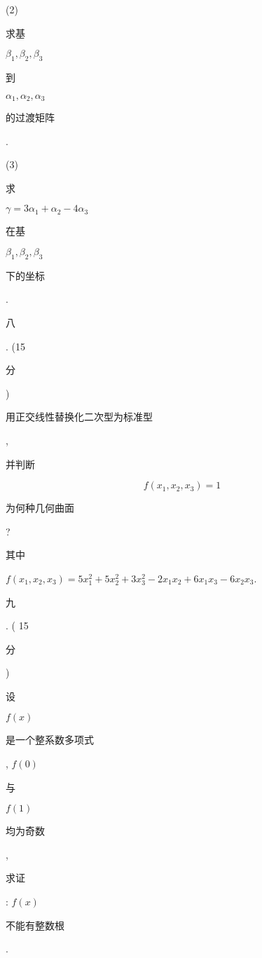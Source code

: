 \documentclass[10pt]{article}
\begin{document}
(2) \begin{CJK}{UTF8}{mj}求基\end{CJK} $\beta_{1}, \beta_{2}, \beta_{3}$ \begin{CJK}{UTF8}{mj}到\end{CJK} $\alpha_{1}, \alpha_{2}, \alpha_{3}$ \begin{CJK}{UTF8}{mj}的过渡矩阵\end{CJK}.

(3) \begin{CJK}{UTF8}{mj}求\end{CJK} $\gamma=3 \alpha_{1}+\alpha_{2}-4 \alpha_{3}$ \begin{CJK}{UTF8}{mj}在基\end{CJK} $\beta_{1}, \beta_{2}, \beta_{3}$ \begin{CJK}{UTF8}{mj}下的坐标\end{CJK}.

\begin{CJK}{UTF8}{mj}八\end{CJK}. (15 \begin{CJK}{UTF8}{mj}分\end{CJK}) \begin{CJK}{UTF8}{mj}用正交线性替换化二次型为标准型\end{CJK}, \begin{CJK}{UTF8}{mj}并判断\end{CJK}
$$
f\left(x_{1}, x_{2}, x_{3}\right)=1
$$
\begin{CJK}{UTF8}{mj}为何种几何曲面\end{CJK}? \begin{CJK}{UTF8}{mj}其中\end{CJK} $f\left(x_{1}, x_{2}, x_{3}\right)=5 x_{1}^{2}+5 x_{2}^{2}+3 x_{3}^{2}-2 x_{1} x_{2}+6 x_{1} x_{3}-6 x_{2} x_{3}$.

\begin{CJK}{UTF8}{mj}九\end{CJK}. ( 15 \begin{CJK}{UTF8}{mj}分\end{CJK}) \begin{CJK}{UTF8}{mj}设\end{CJK} $f(x)$ \begin{CJK}{UTF8}{mj}是一个整系数多项式\end{CJK}, $f(0)$ \begin{CJK}{UTF8}{mj}与\end{CJK} $f(1)$ \begin{CJK}{UTF8}{mj}均为奇数\end{CJK}, \begin{CJK}{UTF8}{mj}求证\end{CJK}: $f(x)$ \begin{CJK}{UTF8}{mj}不能有整数根\end{CJK}.
\end{document}
